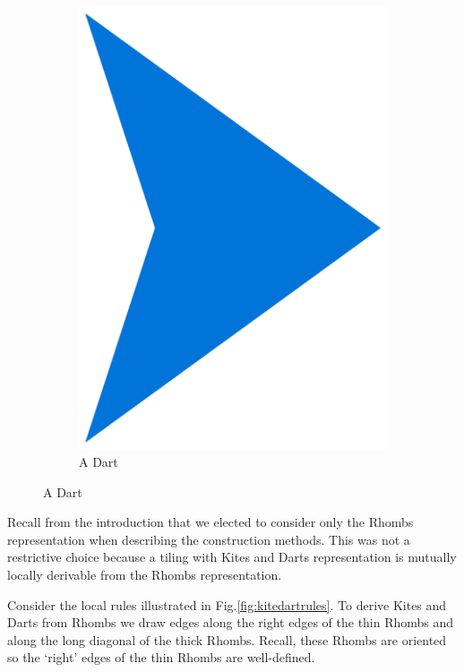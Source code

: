 \documentclass[
  oneside,
  11pt, a4paper,
  footinclude=true,
  headinclude=true,
  cleardoublepage=empty
]{scrbook}
\begin{document}
\begin{figure}
\begin{subfigure}[t]{0.3\textwidth}
\includegraphics[width=\textwidth]{dart}
\caption{A Dart}
\end{subfigure}
\label{fig:kitedart}
\end{figure}

Recall from the introduction that we elected to consider only the Rhombs representation when describing the construction methods. This was not a restrictive choice because a tiling with Kites and Darts representation is mutually locally derivable from the Rhombs representation.

Consider the local rules illustrated in Fig.\ref{fig:kitedartrules}. To derive Kites and Darts from Rhombs we draw edges along the right edges of the thin Rhombs and along the long diagonal of the thick Rhombs. Recall, these Rhombs are oriented so the `right' edges of the thin Rhombs are well-defined. 
\end{document}

